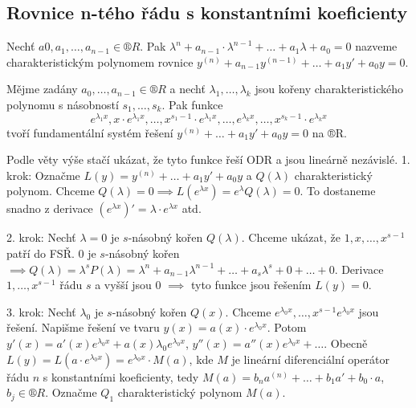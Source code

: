 \documentclass[12pt]{article}                   %
\begin{document}
    \subsection{Rovnice n-tého řádu s konstantními koeficienty}
        \begin{definice}
            Nechť $a0, a_1, …, a_{n-1} \in ®R$. Pak $\lambda^n + a_{n-1}·\lambda^{n-1} + … + a_1\lambda + a_0 = 0$ nazveme charakteristickým polynomem rovnice $y^{(n)} + a_{n-1}y^{(n-1)} + … + a_1y' + a_0y = 0$.
        \end{definice}

        \begin{veta}
            Mějme zadány $a_0, …, a_{n-1} \in ®R$ a nechť $\lambda_1, …, \lambda_k$ jsou kořeny charakteristického polynomu s násobností $s_1, …, s_k$. Pak funkce
            $$ e^{\lambda_1 x}, x·e^{\lambda_1 x}, …, x^{s_1 - 1}·e^{\lambda_1 x}, …, e^{\lambda_k x}, …, x^{s_{k} - 1}·e^{\lambda_k x} $$ 
            tvoří fundamentální systém řešení $y^{(n)} + … + a_1y' + a_0y = 0$ na ®R.

            \begin{dukazin}
                Podle věty výše stačí ukázat, že tyto funkce řeší ODR a jsou lineárně nezávislé. 1. krok: Označme $L(y) = y^{(n)} + … + a_1y' + a_0y$ a $Q(\lambda)$ charakteristický polynom. Chceme $Q(\lambda) = 0 \implies L(e^{\lambda x}) = e^{\lambda} Q(\lambda) = 0$. To dostaneme snadno z derivace $(e^{\lambda x})' = \lambda·e^{\lambda x}$ atd.

                2. krok: Nechť $\lambda = 0$ je $s$-násobný kořen $Q(\lambda)$. Chceme ukázat, že $1, x, …, x^{s-1}$ patří do FSŘ. $0$ je $s$-násobný kořen $\implies Q(\lambda) = \lambda^sP(\lambda) = \lambda^n + a_{n-1}\lambda^{n-1} + … + a_s\lambda^s + 0 + … + 0$. Derivace $1, …, x^{s-1}$ řádu $s$ a vyšší jsou $0$ $\implies$ tyto funkce jsou řešením $L(y) = 0$.


                3. krok: Nechť $\lambda_0$ je $s$-násobný kořen $Q(x)$. Chceme $e^{\lambda_0x}, …, x^{s-1}e^{\lambda_0x}$ jsou řešení. Napišme řešení ve tvaru $y(x) = a(x)·e^{\lambda_0 x}$. Potom $y'(x) = a'(x)e^{\lambda_0 x} + a(x)\lambda_0e^{\lambda_0x}$, $y''(x) = a''(x)e^{\lambda_0 x} + …$. Obecně $L(y) = L(a·e^{\lambda_0 x}) = e^{\lambda_0x}·M(a)$, kde $M$ je lineární diferenciální operátor řádu $n$ s konstantními koeficienty, tedy $M(a) = b_na^{(n)} + … + b_1a' + b_0·a$, $b_j \in ®R$. Označme $Q_1$ charakteristický polynom $M(a)$.
                

\end{dukazin}
\end{veta}
\end{document}
